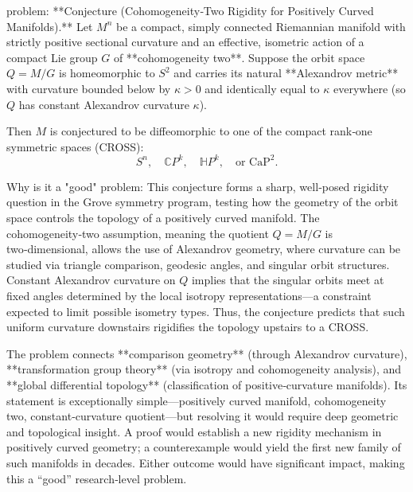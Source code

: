 problem:  
**Conjecture (Cohomogeneity‑Two Rigidity for Positively Curved Manifolds).**  
Let \( M^n \) be a compact, simply connected Riemannian manifold with strictly positive sectional curvature and an effective, isometric action of a compact Lie group \( G \) of **cohomogeneity two**. Suppose the orbit space \( Q = M/G \) is homeomorphic to \( S^2 \) and carries its natural **Alexandrov metric** with curvature bounded below by \( \kappa>0 \) and identically equal to \( \kappa \) everywhere (so \( Q \) has constant Alexandrov curvature \( \kappa \)).  

Then \( M \) is conjectured to be diffeomorphic to one of the compact rank‑one symmetric spaces (CROSS):  
\[
S^n,\quad  \mathbb{C}P^k,\quad \mathbb{H}P^k,\quad \text{or } \mathrm{CaP}^2.
\]

Why is it a "good" problem:  
This conjecture forms a sharp, well‑posed rigidity question in the Grove symmetry program, testing how the geometry of the orbit space controls the topology of a positively curved manifold. The cohomogeneity‑two assumption, meaning the quotient \( Q=M/G \) is two‑dimensional, allows the use of Alexandrov geometry, where curvature can be studied via triangle comparison, geodesic angles, and singular orbit structures. Constant Alexandrov curvature on \( Q \) implies that the singular orbits meet at fixed angles determined by the local isotropy representations—a constraint expected to limit possible isometry types. Thus, the conjecture predicts that such uniform curvature downstairs rigidifies the topology upstairs to a CROSS.  

The problem connects **comparison geometry** (through Alexandrov curvature), **transformation group theory** (via isotropy and cohomogeneity analysis), and **global differential topology** (classification of positive‑curvature manifolds). Its statement is exceptionally simple—positively curved manifold, cohomogeneity two, constant‑curvature quotient—but resolving it would require deep geometric and topological insight. A proof would establish a new rigidity mechanism in positively curved geometry; a counterexample would yield the first new family of such manifolds in decades. Either outcome would have significant impact, making this a “good” research‑level problem.